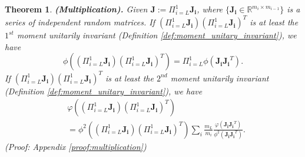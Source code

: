 \documentclass[10pt,journal,compsoc]{IEEEtran}
\newtheorem{theorem}{Theorem}[section]
\begin{document}
\begin{theorem}
\textbf{(Multiplication).} Given $\mathbf{J} := \Pi_{i=L}^1\mathbf{J_i}$, where $\{\mathbf{J_i}\in\mathbb{R}^{m_{i}\times m_{i-1}}\}$ is a series of independent random matrices. If $(\Pi_{i=L}^1\mathbf{J_i})(\Pi_{i=L}^1\mathbf{J_i})^T$ is at least the $1^{st}$ moment unitarily invariant (Definition \ref{def:moment_unitary_invariant}), we have
\begin{equation}
    \phi\left((\Pi_{i=L}^1\mathbf{J_i})(\Pi_{i=L}^1\mathbf{J_i})^T\right) = \Pi_{i=L}^1\phi\left(\mathbf{J_iJ_i}^T\right).
\label{equ:mul_expectation}
\end{equation}
If $(\Pi_{i=L}^1\mathbf{J_i})(\Pi_{i=L}^1\mathbf{J_i})^T$ is at least the $2^{nd}$ moment unitarily invariant (Definition \ref{def:moment_unitary_invariant}), we have
\begin{equation}
\begin{split}
    & \varphi\left((\Pi_{i=L}^1\mathbf{J_i})(\Pi_{i=L}^1\mathbf{J_i})^T\right)\\
    & =\phi^2\left((\Pi_{i=L}^1\mathbf{J_i})(\Pi_{i=L}^1\mathbf{J_i})^T\right) \sum_{i}\frac{m_{L}}{m_{i}}\frac{\varphi\left(\mathbf{J_iJ_i}^T\right)}{\phi^2\left(\mathbf{J_iJ_i}^T\right)}.
\end{split}
\label{equ:mul_variance}
\end{equation}
(Proof: Appendix \ref{proof:multiplication})
\label{theorem:multiplication}
\end{theorem}
\end{document}
